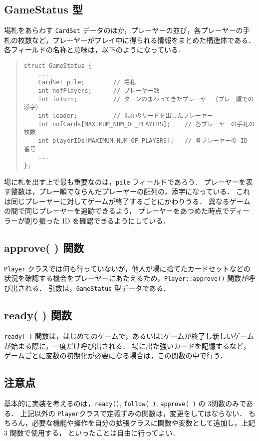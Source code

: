 \subsection{GameStatus 型}

場札をあらわす \verb+CardSet+ データのほか，プレーヤーの並び，各プレーヤーの手札の枚数など，プレーヤーがプレイ中に得られる情報をまとめた構造体である．
各フィールドの名称と意味は，以下のようになっている．
\begin{quote}
\begin{verbatim}
struct GameStatus {
    ...
	CardSet pile;        // 場札
	int nofPlayers;      // プレーヤー数
	int inTurn;          // ターンのまわってきたプレーヤー（プレー順での添字）
	int leader;          // 現在のリードを出したプレーヤー
	int nofCards[MAXIMUM_NUM_OF_PLAYERS];    // 各プレーヤーの手札の枚数
	int playerIDs[MAXIMUM_NUM_OF_PLAYERS];   // 各プレーヤーの ID 番号
    ...
};
\end{verbatim}
\end{quote}
場に札を出す上で最も重要なのは，\verb+pile+ フィールドであろう．
プレーヤーを表す整数は，プレー順でならんだプレーヤーの配列の，添字になっている．
これは同じプレーヤーに対してゲームが終了するごとにかわりうる．
異なるゲームの間で同じプレーヤーを追跡できるよう，
プレーヤーをあつめた時点でディーラーが割り振った ID を確認できるようにしている．

\subsection{approve( ) 関数}
\verb+Player+ クラスでは何も行っていないが，他人が場に捨てたカードセットなどの状況を確認する機会をプレーヤーにあたえるため，\verb+Player::approve()+ 関数が呼び出される．
引数は，\verb+GameStatus+ 型データである．


\subsection{ready( ) 関数}
\verb+ready( )+ 関数は，はじめてのゲームで，あるいは1ゲームが終了し新しいゲームが始まる際に，一度だけ呼び出される．
場に出た強いカードを記憶するなど，ゲームごとに変数の初期化が必要になる場合は，この関数の中で行う．

\subsection{注意点}
基本的に実装を考えるのは，\verb+ready()+, \verb+follow( )+, \verb+approve( )+ の 3関数のみである．
上記以外の \verb+Player+クラスで定義ずみの関数は，変更をしてはならない．
もちろん，必要な機能や操作を自分の拡張クラスに関数や変数として追加し，上記 3 関数で使用する，
といったことは自由に行ってよい．

